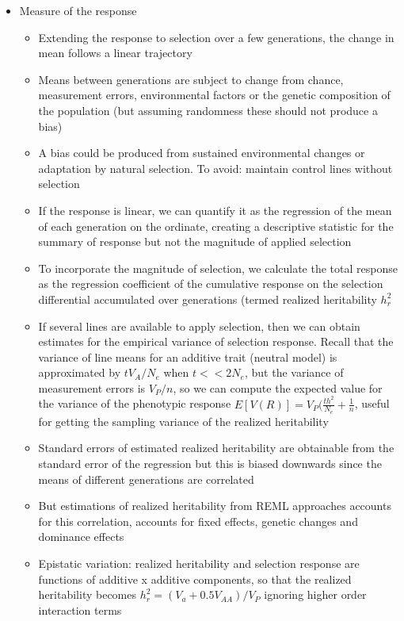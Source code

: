 \documentclass[12pt]{amsart}
\begin{document}
\begin{itemize}
\begin{itemize}
\end{itemize}
\item Measure of the response
\begin{itemize}
\item Extending the response to selection over a few generations, the change in mean follows a linear trajectory
\item Means between generations are subject to change from chance, measurement errors, environmental factors or the genetic composition of the population (but assuming randomness these should not produce a bias)
\item A bias could be produced from sustained environmental changes or adaptation by natural selection. To avoid: maintain control lines without selection
\item If the response is linear, we can quantify it as the regression of the mean of each generation on the ordinate, creating a descriptive statistic for the summary of response but not the magnitude of applied selection
\item To incorporate the magnitude of selection, we calculate the total response as the regression coefficient of the cumulative response on the selection differential accumulated over generations (termed realized heritability $h^2_r$  
\item If several lines are available to apply selection, then we can obtain estimates for the empirical variance of selection response. Recall that the variance of line means for an additive trait (neutral model) is approximated by $tV_A/N_e$ when $t << 2N_e$, but the variance of measurement errors is $V_P/n$, so we can compute the expected value for the variance of the phenotypic response $E[V(R)] = V_P(\frac{th^2}{N_e}+\frac{1}{n}$, useful for getting the sampling variance of the realized heritability 
\item Standard errors of estimated realized heritability are obtainable from the standard error of the regression but this is biased downwards since the means of different generations are correlated
\item But estimations of realized heritability from REML approaches accounts for this correlation, accounts for fixed effects, genetic changes and dominance effects
\item Epistatic variation: realized heritability and selection response are functions of additive x additive components, so that the realized heritability becomes $h^2_r = (V_a + 0.5V_{AA})/V_P$ ignoring higher order interaction terms
\end{itemize}

\end{itemize}
\end{document}
